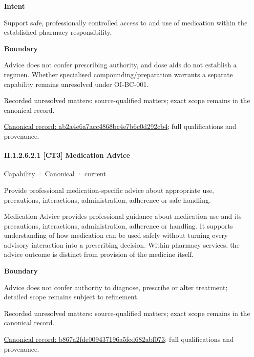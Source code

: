 \textbf{Intent}



Support safe, professionally controlled access to and use of medication within the established pharmacy responsibility.



\textbf{Boundary}



Advice does not confer prescribing authority, and dose aids do not establish a regimen. Whether specialised compounding/preparation warrants a separate capability remains unresolved under OI-BC-001.


{\small Recorded unresolved matters: source-qualified matters; exact scope remains in the canonical record.}\par
{\footnotesize \href{../../../../../../../continuum/strategy/capability/ab2a4e6a7acc4868bc4e7b6c0d292cb4.md}{Canonical record: ab2a4e6a7acc4868bc4e7b6c0d292cb4}; full qualifications and provenance.}\par
\paragraph*{II.1.2.6.2.1 [CT3] Medication Advice}
\label{navigation:II.1.2.6.2.1}

\label{element:b867a2fde009437196a5fed682abf073}
{\small Capability · Canonical · current}\par

Provide professional medication-specific advice about appropriate use, precautions, interactions, administration, adherence or safe handling.



Medication Advice provides professional guidance about medication use and its precautions, interactions, administration, adherence or handling. It supports understanding of how medication can be used safely without turning every advisory interaction into a prescribing decision. Within pharmacy services, the advice outcome is distinct from provision of the medicine itself.



\textbf{Boundary}



Advice does not confer authority to diagnose, prescribe or alter treatment; detailed scope remains subject to refinement.


{\small Recorded unresolved matters: source-qualified matters; exact scope remains in the canonical record.}\par
{\footnotesize \href{../../../../../../../continuum/strategy/capability/b867a2fde009437196a5fed682abf073.md}{Canonical record: b867a2fde009437196a5fed682abf073}; full qualifications and provenance.}\par
